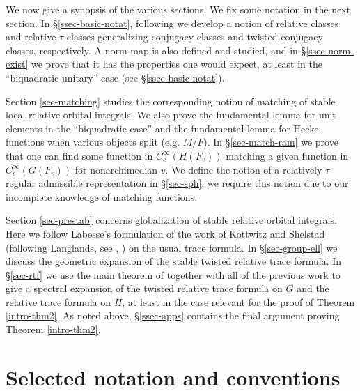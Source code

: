 \documentclass[12pt]{amsart}
\theoremstyle{remark}
\numberwithin{equation}{section}
\theoremstyle{definition}
\numberwithin{equation}{subsection}
\begin{document}
We now give a synopsis of the various sections.  We fix some notation in the next section.  In
\S \ref{ssec-basic-notat},
 following \cite{JacquetLai} we
develop a notion of relative classes and relative $\tau$-classes generalizing conjugacy classes and twisted conjugacy
classes, respectively.
A norm map is also defined and studied, and in \S \ref{ssec-norm-exist}
we prove that it has the properties one would expect,
 at least in the ``biquadratic unitary'' case (see \S \ref{ssec-basic-notat}).

Section \ref{sec-matching} studies the corresponding notion of matching of stable local relative orbital integrals.  We also prove the fundamental lemma for unit elements in the ``biquadratic case'' and the fundamental lemma for
Hecke functions when various objects split (e.g. $M/F$). In \S \ref{sec-match-ram} we prove that one can find some function in $C_c^{\infty}(H(F_v))$ matching a given function in $C^{\infty}_c(G(F_v))$ for nonarchimedian $v$.  We define the notion of a relatively $\tau$-regular admissible representation in \S \ref{sec-sph}; we require this notion due to our incomplete knowledge of matching functions.

Section \ref{sec-prestab} concerns globalization of stable relative orbital integrals.  Here we follow Labesse's formulation
\cite{Lab} of
the work of Kottwitz and Shelstad (following Langlands, see \cite{KS}, \cite{LanglStab}) on the usual trace formula.  In \S \ref{sec-group-ell} we discuss the geometric expansion of the stable twisted relative trace formula.
In \S \ref{sec-rtf} we use the main theorem of \cite{Hahn} together with all of the previous work to
give a spectral expansion of the twisted relative trace
formula on $G$ and the relative trace formula on $H$, at least in the case relevant for the proof of Theorem
\ref{intro-thm2}.  As noted above,
\S \ref{ssec-apps} contains the final argument proving Theorem \ref{intro-thm2}.

\section{Selected notation and conventions}

\label{sec-notation}
\end{document}
